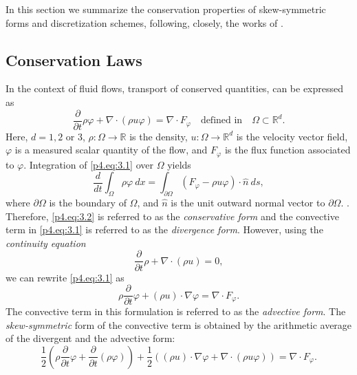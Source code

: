 In this section we summarize the conservation properties of skew-symmetric forms and discretization schemes, following, closely, the works of \cite{morinishi2010skew,morinishi1998fully,tadmor1984skew,reiss2014conservative}.

\subsection{Conservation Laws} \label{p4.sec:skew.1}
In the context of fluid flows, transport of conserved quantities, can be expressed as
\begin{equation} \label{p4.eq:3.1}
	\frac{\partial }{\partial t} \rho \varphi + \nabla \cdot ( \rho u \varphi  ) = \nabla \cdot F_{\varphi}\quad \text{defined in} \quad \Omega \subset \mathbb R^{d}.
\end{equation}
Here, $d = 1,2$ or $3$, $\rho:\Omega\to \mathbb R$ is the density, $u: \Omega \to \mathbb R^{d}$ is the velocity vector field, $\varphi$ is a measured scalar quantity of the flow, and $F_{\varphi}$ is the flux function associated to $\varphi$. Integration of \eqref{p4.eq:3.1} over $ \Omega$ yields
\begin{equation} \label{p4.eq:3.2}
	\frac{d}{dt} \int_{\Omega} \rho \varphi \ dx = \int_{\partial \Omega} (F_{\varphi} - \rho u \varphi) \cdot \hat n\ ds,
\end{equation}
where $\partial \Omega$ is the boundary of $\Omega$, and $\hat n$ is the unit outward normal vector to $\partial \Omega$. . Therefore, \eqref{p4.eq:3.2} is referred to as the \emph{conservative form} and the convective term in \eqref{p4.eq:3.1} is referred to as the \emph{divergence form}. However, using the \emph{continuity equation}
\begin{equation} \label{p4.eq:3.3}
	\frac{\partial }{\partial t} \rho + \nabla \cdot (\rho u) = 0,
\end{equation}
we can rewrite \eqref{p4.eq:3.1} as
\begin{equation} \label{p4.eq:3.4}
	\rho \frac{\partial }{\partial t} \varphi + (\rho u)\cdot \nabla \varphi = \nabla \cdot F_{\varphi}.
\end{equation}
The convective term in this formulation is referred to as the \emph{advective form}. The \emph{skew-symmetric} form of the convective term is obtained by the arithmetic average of the divergent and the advective form:
\begin{equation} \label{p4.eq:3.5}
	\frac{1}{2} \left( \rho \frac{\partial }{\partial t} \varphi + \frac{\partial }{\partial t} (\rho \varphi) \right) + \frac 1 2 \left( (\rho u)\cdot \nabla \varphi + \nabla \cdot (\rho u \varphi) \right) = \nabla \cdot F_{\varphi}.
\end{equation}
